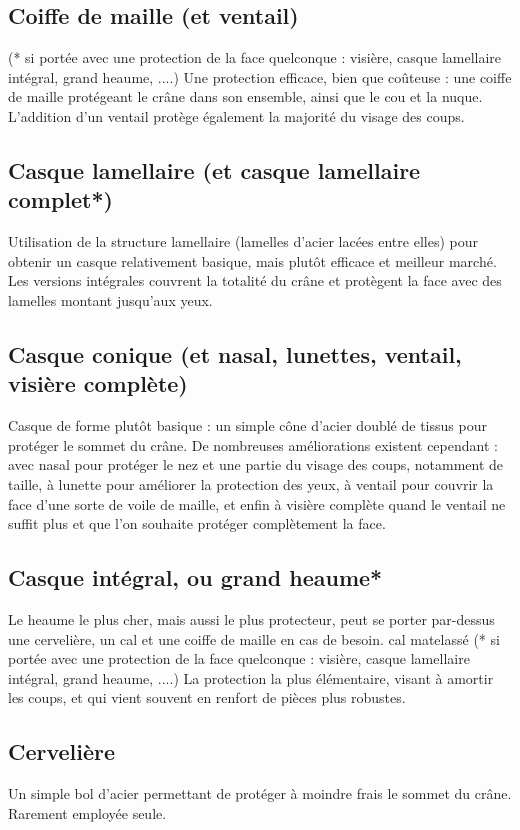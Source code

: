 \documentclass[10pt,a4paper,twocolumn]{book}
\begin{document}
\subsection*{Coiffe de maille (et ventail)}
 (* si portée avec une protection de la face quelconque : visière, casque lamellaire intégral, grand heaume, ....)
Une protection efficace, bien que coûteuse : une coiffe de maille protégeant le crâne dans son ensemble, ainsi que le cou et la nuque. L'addition d'un ventail protège également la majorité du visage des coups.
\subsection*{Casque lamellaire (et casque lamellaire complet*)}
Utilisation de la structure lamellaire (lamelles d'acier lacées entre elles) pour obtenir un casque relativement basique, mais plutôt efficace et meilleur marché. Les versions intégrales couvrent la totalité du crâne et protègent la face avec des lamelles montant jusqu'aux yeux.
\subsection*{Casque conique (et nasal, lunettes, ventail, visière complète)}
Casque de forme plutôt basique : un simple cône d'acier doublé de tissus pour protéger le sommet du crâne. De nombreuses améliorations existent cependant : avec nasal pour protéger le nez et une partie du visage des coups, notamment de taille, à lunette pour améliorer la protection des yeux, à ventail pour couvrir la face d'une sorte de voile de maille, et enfin à visière complète quand le ventail ne suffit plus et que l'on souhaite protéger complètement la face.
\subsection*{Casque intégral, ou grand heaume*}
Le heaume le plus cher, mais aussi le plus protecteur, peut se porter par-dessus une cervelière, un cal et une coiffe de maille en cas de besoin.
cal matelassé
(* si portée avec une protection de la face quelconque : visière, casque lamellaire intégral, grand heaume, ....)
La protection la plus élémentaire, visant à amortir les coups, et qui vient souvent en renfort de pièces plus robustes.
\subsection*{Cervelière}
Un simple bol d'acier permettant de protéger à moindre frais le sommet du crâne. Rarement employée seule.
\end{document}
